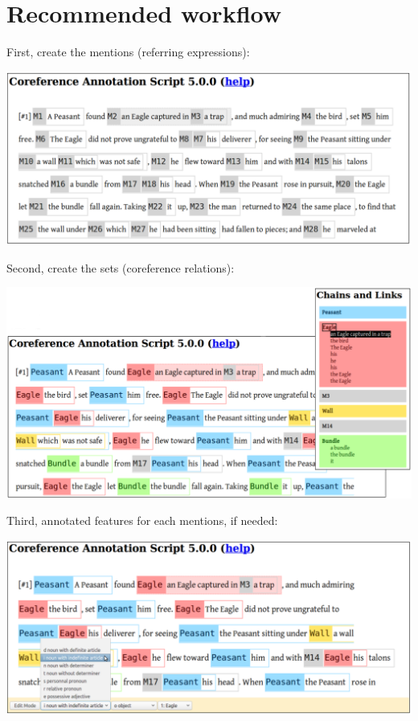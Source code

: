 \documentclass[12pt]{article}
\begin{document}
 \section{Recommended workflow}

First, create the mentions (referring expressions):\nopagebreak

\includegraphics[width=15cm]{imgs/workflow1.png}

Second, create the sets (coreference relations):\nopagebreak

\includegraphics[width=15cm]{imgs/workflow2.png}

Third, annotated features for each mentions, if needed:\nopagebreak

\includegraphics[width=15cm]{imgs/workflow3.png}
\end{document}

